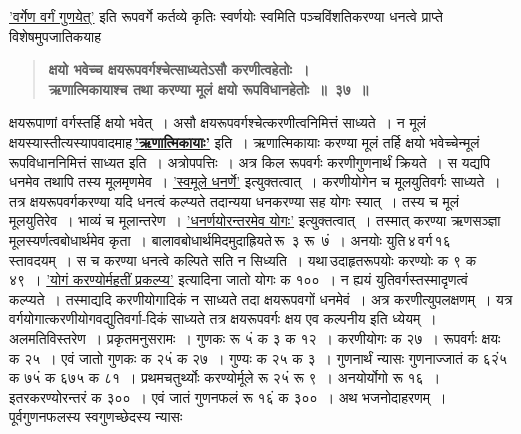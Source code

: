 \documentclass[11pt, openany]{book}
\begin{document}
\begin{sloppypar}
{\small \hyperref[4.34]{'वर्गेण वर्गं गुणयेत्'} इति रूपवर्गे कर्तव्ये कृतिः स्वर्णयोः स्वमिति पञ्चविंशतिकरण्या धनत्वे प्राप्ते विशेषमुपजातिकयाह\textendash }

 \label{4.37}
\begin{quote}
{\large \textbf{{\color{purple}क्षयो भवेच्च क्षयरूपवर्गश्चेत्साध्यतेऽसौ करणीत्वहेतोः~। \\
ऋणात्मिकायाश्च तथा करण्या मूलं क्षयो रूपविधानहेतोः~॥~३७~॥}}}
\end{quote}
\end{sloppypar}

\newpage

\begin{sloppypar}
क्षयरूपाणां वर्गस्तर्हि क्षयो भवेत्~। असौ क्षयरूपवर्गश्चेत्करणीत्वनिमित्तं साध्यते~। न मूलं क्षयस्यास्तीत्यस्यापवादमाह\textendash \,\hyperref[4.37]{\textbf{'ऋणात्मिकायाः'}} इति~। ऋणात्मिकायाः करण्या मूलं तर्हि क्षयो भवेच्चेन्मूलं रूपविधाननिमित्तं साध्यत इति~। अत्रोपपत्तिः~। अत्र किल रूपवर्गः करणीगुणनार्थं क्रियते~। स यद्यपि धनमेव तथापि तस्य मूलमृणमेव~। \hyperref[1.13]{'स्वमूले धनर्णे'} इत्युक्तत्वात्~। करणीयोगेन च मूलयुतिवर्गः साध्यते~। तत्र क्षयरूपवर्गकरण्या यदि धनत्वं कल्प्यते तदान्यया धनकरण्या सह योगः स्यात्~। तस्य च मूलं मूलयुतिरेव~। भाव्यं च मूलान्तरेण~। \hyperref[1.3]{'धनर्णयोरन्तरमेव योगः'} इत्युक्तत्वात्~। तस्मात् करण्या ऋणसञ्ज्ञा मूलस्यर्णत्वबोधार्थमेव \;कृता~। \;बालावबोधार्थमिदमुदाह्रियते\textendash \,रू \,३ रू \,७ं~। \;अनयोः युति\textendash \,४\textendash \,वर्ग\textendash \,१६\textendash \,स्तावदयम्~। स च करण्या धनत्वे कल्पिते सति न सिध्यति~। यथा\textendash \,उदाहृतरूपयोः करण्योः क ९ क ४९~। \hyperref[4.34]{'योगं करण्योर्महतीं प्रकल्प्य'} इत्यादिना जातो योगः क १००~। न ह्ययं युतिवर्गस्तस्मादृणत्वं कल्प्यते~। तस्माद्यदि करणीयोगादिकं न साध्यते तदा क्षयरूपवगों धनमेवं~। अत्र करणीत्युपलक्षणम्~। यत्र वर्गयोगात्करणीयोगवद्युतिवर्गा-दिकं साध्यते तत्र क्षयरूपवर्गः क्षय एव कल्पनीय इति ध्येयम्~। अलमतिविस्तरेण~। प्रकृतमनुसरामः~। गुणकः रू ५ं क ३ क १२~। करणीयोगः क २७~। रूपवर्गः क्षयः क २५~। एवं जातो गुणकः क २५ं क २७~। गुण्यः क २५ क ३~। गुणनार्थं न्यासः\textendash {}\; गुणनाज्जातं क ६२ं५ क ७५ं क ६७५ क ८१~। प्रथमचतुर्थ्योः करण्योर्मूले रू २५ं रू ९~। अनयोर्योगो रू १६~। इतरकरण्योरन्तरं क ३००~। एवं जातं गुणनफलं रू १६ं क ३००~। अथ भजनोदाहरणम्~। पूर्वगुणनफलस्य स्वगुणच्छेदस्य न्यासः\textendash \;{\scriptsize $\begin{matrix}

\end{matrix}}
\end{sloppypar}
\end{document}
